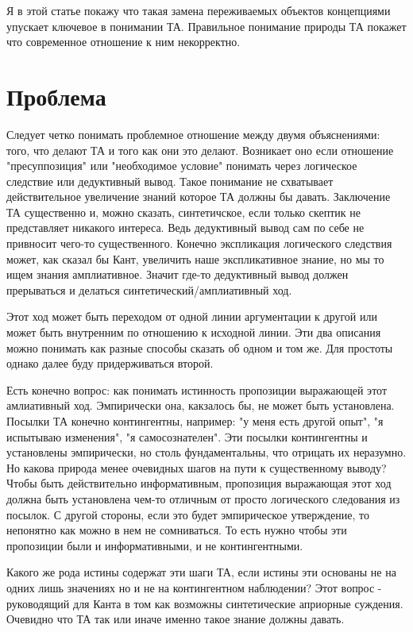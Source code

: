 \documentclass{article}
\begin{document}
Я в этой статье покажу что такая замена переживаемых объектов концепциями упускает ключевое в понимании ТА. Правильное понимание природы ТА покажет что современное отношение к ним некорректно.

\section{Проблема}

Следует четко понимать проблемное отношение между двумя объяснениями: того, что делают ТА и того как они это делают. Возникает оно если отношение "пресуппозиция" или "необходимое условие" понимать через логическое следствие или дедуктивный вывод. Такое понимание не схватывает действительное увеличение знаний которое ТА должны бы давать. Заключение ТА существенно и, можно сказать, синтетичское, если только скептик не представляет никакого интереса. Ведь дедуктивный вывод сам по себе не привносит чего-то существенного. Конечно экспликация логического следствия может, как сказал бы Кант, увеличить наше экспликативное знание, но мы то ищем знания амплиативное. Значит где-то дедуктивный вывод должен прерываться и делаться синтетический/амплиативный ход.

Этот ход может быть переходом от одной линии аргументации к другой или может быть внутренним по отношению к исходной линии. Эти два описания можно понимать как разные способы сказать об одном и том же. Для простоты однако далее буду придерживаться второй.

Есть конечно вопрос: как понимать истинность пропозиции выражающей этот амлиативный ход. Эмпирически она, какзалось бы, не может быть установлена. Посылки ТА конечно контингентны, например: "у меня есть другой опыт", "я испытываю изменения", "я самосознателен". Эти посылки контингентны и установлены эмпирически, но столь фундаментальны, что отрицать их неразумно. Но какова природа менее очевидных шагов на пути к существенному выводу? Чтобы быть действительно информативным, пропозиция выражающая этот ход должна быть установлена чем-то отличным от просто логического следования из посылок. С другой стороны, если это будет эмпирическое утверждение, то непонятно как можно в нем не сомниваться. То есть нужно чтобы эти пропозиции были и информативными, и не контингентными.

Какого же рода истины содержат эти шаги ТА, если истины эти основаны не на одних лишь значениях но и не на контингентном наблюдении? Этот вопрос - руководящий для Канта в том как возможны синтетические априорные суждения. Очевидно что ТА так или иначе именно такое знание должны давать.
\end{document}
